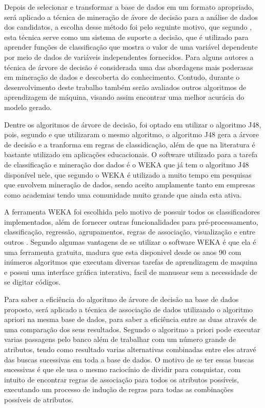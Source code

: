 \par
Depois de selecionar e transformar a base de dados em um formato apropriado, será aplicado a técnica de mineração de ávore de decisão para a análise de dados dos candidatos, a escolha desse método foi pelo seguinte motivo, que segundo , esta técnica serve como um sistema de suporte a decisão, que é utilizado para aprender funções de classificação que mostra o valor de uma variável dependente por meio de dados de variáveis independentes fornecidos. Para alguns autores a técnica de árvore de decisão é considerada uma das abordagens mais poderasas em mineração de dados e descoberta do conhecimento. Contudo, durante o desenvolvimento deste trabalho também serão avaliados outros algoritmos de aprendizagem de máquina, visando assim encontrar uma melhor acurácia do modelo gerado.

\par
Dentre os algoritmos de árvore de decisão, foi optado em utilizar o algoritmo J48, pois, segundo  e  que utilizaram o mesmo algoritmo, o algoritmo J48 gera a árvore de decisão e a tranforma em regras de classidicação, além de que na literatura é bastante utilizado em aplicações educacionais. O software utilizado para a tarefa de classificação e mineração dos dados é o WEKA que já tem o algoritmo J48 disponível nele, que segundo  o WEKA é utilizado a muito tempo em pesquisas que envolvem mineração de dados, sendo aceito amplamente tanto em empresas como academias tendo uma comunidade muito grande que ainda esta ativa.

\par
A ferramenta WEKA foi escolhida pelo motivo de possuir todos os classificadores implementados, além de fornecer outras funcionalidades para pré-processamento, classificação, regressão, agrupamentos, regras de associação, visualização e entre outros \cite{Camilo2009}. Segundo  algumas vantagens de se utilizar o software WEKA é que ela é uma ferramenta gratuita, madura que esta disponivel desde os anos 90 com inúmeros algoritmos que executam diversas tarefas de aprendizagem de maquina e possui uma interface gráfica interativa, facil de manusear sem a necessidade de se digitar códigos. 

\par
Para saber a eficiência do algoritmo de árvore de decisão na base de dados proposto, será aplicado a técnica de associação de dados utilizando o algoritmo apriori na mesma base de dados, para saber a eficiência entre as duas através de uma comparação dos seus resultados. Segundo  o algoritmo a priori pode executar varias passagens pelo banco além de trabalhar com um número grande de atributos, tendo como resultado varias alternativas combinadas entre eles atravé das buscas sucessivas em toda a base de dados. O motivo de se ter essas buscas sucessivas é que ele usa o mesmo raciocínio de dividir para conquistar, com intuito de encontrar regras de associação para todos os atributos possíveis, executando um processo de indução de regras para todas as combinações possíveis de atributos.


